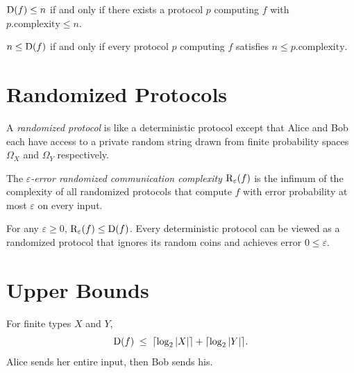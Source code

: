 \begin{lemma}
  \label{lem:det_cc_le_iff}
  \leanok
  $\mathrm{D}(f) \le n$ if and only if there exists a protocol $p$ computing $f$ with
  $p.\mathrm{complexity} \le n$.
\end{lemma}

\begin{lemma}
  \label{lem:le_det_cc_iff}
  \leanok
  $n \le \mathrm{D}(f)$ if and only if every protocol $p$ computing $f$ satisfies
  $n \le p.\mathrm{complexity}$.
\end{lemma}

\section{Randomized Protocols}

\begin{definition}
  \label{def:rand_protocol}
  \leanok
  A \emph{randomized protocol} is like a deterministic protocol except that
  Alice and Bob each have access to a private random string drawn from finite
  probability spaces $\Omega_X$ and $\Omega_Y$ respectively.
\end{definition}

\begin{definition}
  \label{def:rand_cc}
  \leanok
  The \emph{$\varepsilon$-error randomized communication complexity} $\mathrm{R}_\varepsilon(f)$
  is the infimum of the complexity of all randomized protocols that compute $f$
  with error probability at most $\varepsilon$ on every input.
\end{definition}

\begin{theorem}
  \label{thm:rand_le_det}
  \leanok
  For any $\varepsilon \ge 0$, $\mathrm{R}_\varepsilon(f) \le \mathrm{D}(f)$.
  Every deterministic protocol can be viewed as a randomized protocol that
  ignores its random coins and achieves error $0 \le \varepsilon$.
\end{theorem}

\section{Upper Bounds}

\begin{theorem}
  \label{thm:det_cc_le_clog}
  \leanok
  For finite types $X$ and $Y$,
  \[
    \mathrm{D}(f) \;\le\; \lceil \log_2 |X| \rceil + \lceil \log_2 |Y| \rceil.
  \]
  Alice sends her entire input, then Bob sends his.
\end{theorem}

